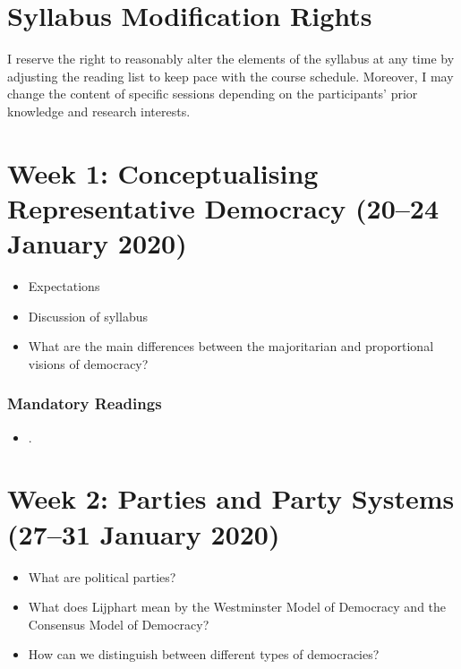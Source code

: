 \documentclass[abstract=on,parskip=full,headings=standardclasses,fontsize=11pt,paper=a4]{scrartcl}
\begin{document}
\section*{Syllabus Modification Rights}

I reserve the right to reasonably alter the elements of the syllabus at any time by adjusting the reading list to keep pace with the course schedule. Moreover, I may change the content of specific sessions depending on the participants' prior knowledge and research interests.



\newpage

\tableofcontents

\section{Week 1: Conceptualising Representative Democracy (20--24 January 2020)}

\begin{itemize}
\renewcommand\labelitemi{--}
\item Expectations
\item Discussion of syllabus
\item What are the main differences between the majoritarian and proportional visions of democracy?
\end{itemize}


\subsubsection*{Mandatory Readings}
\begin{itemize}
\item {}.
\end{itemize}


\section{Week 2: Parties and Party Systems (27--31 January 2020)}

\begin{itemize}
\renewcommand\labelitemi{--}
\item  What are political parties?
\item What does Lijphart mean by the Westminster Model of Democracy and the Consensus Model of Democracy?
\item How can we distinguish between different types of democracies?
\end{itemize}
\end{document}
